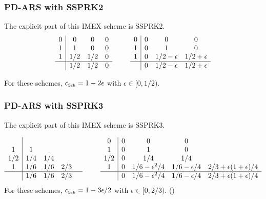 \subsubsection{PD-ARS with SSPRK2}
The explicit part of this IMEX scheme is SSPRK2.
\begin{equation}
  \begin{array}{c | c c c}
  	0 & 0   & 0 & 0 \\
  	1 & 1   & 0 & 0 \\
  	1 & 1/2 & 1/2 & 0 \\ \hline
  	  & 1/2 & 1/2 & 0
  \end{array}
  \qquad
  \begin{array}{c | c c c}
  	0 & 0 & 0            & 0            \\
  	1 & 0 & 1            & 0            \\
  	1 & 0 & 1/2-\epsilon & 1/2+\epsilon \\ \hline
  	  & 0 & 1/2-\epsilon & 1/2+\epsilon
  \end{array}
\end{equation}

For these schemes, $c_{\mbox{\tiny Sch}}= 1 - 2\epsilon$ with $\epsilon \in [0, 1/2)$.

\subsubsection{PD-ARS with SSPRK3}
The explicit part of this IMEX scheme is SSPRK3.

\begin{equation}
  \begin{array}{c | c c c c}
  	    &     &     &     &  \\
  	 1  & 1   &     &     &  \\
  	1/2 & 1/4 & 1/4 &  \\
  	 1  & 1/6 & 1/6 & 2/3 &  \\ \hline
  	    & 1/6 & 1/6 & 2/3 &
  \end{array}
  \qquad
  \begin{array}{c | c c c c}
  	0 & 0 & 0            & 0            \\
  	1 & 0 & 1            & 0            \\
  	1/2 & 0 & 1/4 & 1/4 \\ 
  	1 & 0 & 1/6-\epsilon^2 /4 & 1/6-\epsilon/4 & 2/3+\epsilon(1+\epsilon)/4\\\hline
  	  & 0 & 1/6-\epsilon^2 /4 & 1/6-\epsilon/4 & 2/3+\epsilon(1+\epsilon)/4
  \end{array}
\end{equation}
For these schemes, $c_{\mbox{\tiny Sch}}= 1 - 3\epsilon/2$ with $\epsilon \in [0,2/3)$. ()